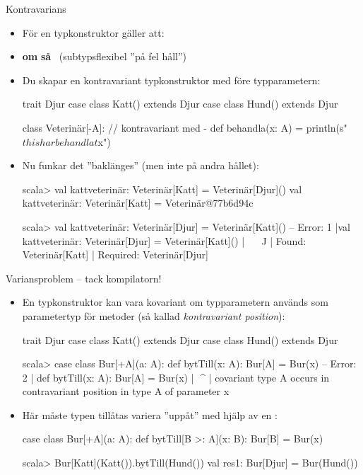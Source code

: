 \begin{Slide}{Kontravarians }
\begin{itemize}\SlideFontSmall
\item För en  typkonstruktor  gäller att: 
\item[] \textbf{om}  \textbf{så} ~(subtypsflexibel ''på fel håll'')
\item Du skapar en kontravariant typkonstruktor med \code{-} före typparametern:
\begin{Code}
trait Djur 
case class Katt() extends Djur
case class Hund() extends Djur

class Veterinär[-A]:    // kontravariant med -
  def behandla(x: A) = println(s"$this har behandlat $x")  
\end{Code}
\pause
\item Nu funkar det ''baklänges'' (men inte på andra hållet):
\begin{REPLsmall}
scala> val kattveterinär: Veterinär[Katt] = Veterinär[Djur]()
val kattveterinär: Veterinär[Katt] = Veterinär@77b6d94c

scala> val kattveterinär: Veterinär[Djur] = Veterinär[Katt]()
-- Error:
1 |val kattveterinär: Veterinär[Djur] = Veterinär[Katt]()
  |                                     ^^^^^^^^^^^^^^^^^
  |                                     Found:    Veterinär[Katt]
  |                                     Required: Veterinär[Djur]
\end{REPLsmall}
\end{itemize}

\end{Slide}

\begin{Slide}{Variansproblem -- tack kompilatorn!}
\begin{itemize}\SlideFontSmall
\item En typkonstruktor kan  vara kovariant om typparametern används som parametertyp för metoder (så kallad \emph{kontravariant position}):
\begin{Code}
trait Djur
case class Katt() extends Djur
case class Hund() extends Djur
\end{Code}
\begin{REPLsmall}
scala> case class Bur[+A](a: A): 
         def bytTill(x: A): Bur[A] = Bur(x)
-- Error:
2 |  def bytTill(x: A): Bur[A] = Bur(x)
  |          ^^^^
  |  covariant type A occurs in contravariant position in type A of parameter x
\end{REPLsmall}
\pause
\item Här måste typen tillåtas variera ''uppåt'' med hjälp av en :
\begin{Code}
case class Bur[+A](a: A): 
  def bytTill[B >: A](x: B): Bur[B] = Bur(x)
\end{Code}
\begin{REPLsmall}
scala> Bur[Katt](Katt()).bytTill(Hund())
val res1: Bur[Djur] = Bur(Hund())
\end{REPLsmall}
\end{itemize}
\end{Slide}

